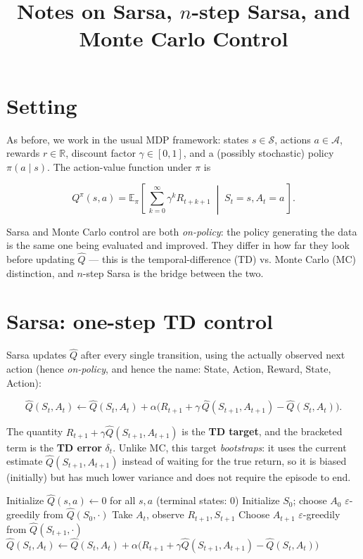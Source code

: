 \documentclass[11pt]{article}
\title{Notes on Sarsa, $n$-step Sarsa, and Monte Carlo Control}
\author{}
\date{}
\begin{document}
\maketitle

\section{Setting}

As before, we work in the usual MDP framework: states $s \in \mathcal{S}$,
actions $a \in \mathcal{A}$, rewards $r \in \mathbb{R}$, discount factor
$\gamma \in [0,1]$, and a (possibly stochastic) policy $\pi(a \mid s)$. The
action-value function under $\pi$ is

\[
    Q^\pi(s,a) = \mathbb{E}_\pi\!\left[\, \sum_{k=0}^{\infty} \gamma^k R_{t+k+1} \;\middle|\; S_t = s, A_t = a \,\right].
\]

Sarsa and Monte Carlo control are both \emph{on-policy}: the policy
generating the data is the same one being evaluated and improved. They
differ in how far they look before updating $\hat{Q}$ — this is the
temporal-difference (TD) vs. Monte Carlo (MC) distinction, and $n$-step
Sarsa is the bridge between the two.

\section{Sarsa: one-step TD control}

Sarsa updates $\hat{Q}$ after every single transition, using the actually
observed next action (hence \emph{on-policy}, and hence the name: State,
Action, Reward, State, Action):

\[
    \hat{Q}(S_t, A_t) \leftarrow \hat{Q}(S_t, A_t) + \alpha \Big( R_{t+1} + \gamma\, \hat{Q}(S_{t+1}, A_{t+1}) - \hat{Q}(S_t, A_t) \Big).
\]

The quantity $R_{t+1} + \gamma \hat{Q}(S_{t+1}, A_{t+1})$ is the
\textbf{TD target}, and the bracketed term is the \textbf{TD error}
$\delta_t$. Unlike MC, this target \emph{bootstraps}: it uses the current
estimate $\hat{Q}(S_{t+1}, A_{t+1})$ instead of waiting for the true return,
so it is biased (initially) but has much lower variance and does not
require the episode to end.

\begin{algorithm}[h]
\caption{Sarsa (on-policy TD control)}
\begin{algorithmic}[1]
\State Initialize $\hat{Q}(s,a) \leftarrow 0$ for all $s,a$ (terminal states: $0$)
    \State Initialize $S_0$; choose $A_0$ $\varepsilon$-greedily from $\hat{Q}(S_0, \cdot)$
        \State Take $A_t$, observe $R_{t+1}, S_{t+1}$
        \State Choose $A_{t+1}$ $\varepsilon$-greedily from $\hat{Q}(S_{t+1}, \cdot)$
        \State $\hat{Q}(S_t, A_t) \leftarrow \hat{Q}(S_t, A_t) + \alpha \big( R_{t+1} + \gamma \hat{Q}(S_{t+1}, A_{t+1}) - \hat{Q}(S_t, A_t) \big)$
    \EndFor
\EndFor
\end{algorithmic}
\end{algorithm}
\end{document}
